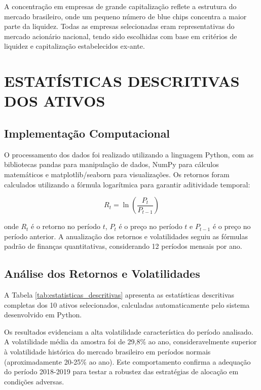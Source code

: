 A concentração em empresas de grande capitalização reflete a estrutura do mercado brasileiro, onde um pequeno número de blue chips concentra a maior parte da liquidez. Todas as empresas selecionadas eram representativas do mercado acionário nacional, tendo sido escolhidas com base em critérios de liquidez e capitalização estabelecidos ex-ante.

\section{ESTATÍSTICAS DESCRITIVAS DOS ATIVOS}

\subsection{Implementação Computacional}

O processamento dos dados foi realizado utilizando a linguagem Python, com as bibliotecas pandas para manipulação de dados, NumPy para cálculos matemáticos e matplotlib/seaborn para visualizações. Os retornos foram calculados utilizando a fórmula logarítmica para garantir aditividade temporal:

\begin{equation}
R_t = \ln\left(\frac{P_t}{P_{t-1}}\right)
\end{equation}

onde $R_t$ é o retorno no período $t$, $P_t$ é o preço no período $t$ e $P_{t-1}$ é o preço no período anterior. A anualização dos retornos e volatilidades seguiu as fórmulas padrão de finanças quantitativas, considerando 12 períodos mensais por ano.

\subsection{Análise dos Retornos e Volatilidades}

A Tabela \ref{tab:estatisticas_descritivas} apresenta as estatísticas descritivas completas dos 10 ativos selecionados, calculadas automaticamente pelo sistema desenvolvido em Python.



Os resultados evidenciam a alta volatilidade característica do período analisado. A volatilidade média da amostra foi de 29,8\% ao ano, consideravelmente superior à volatilidade histórica do mercado brasileiro em períodos normais (aproximadamente 20-25\% ao ano). Este comportamento confirma a adequação do período 2018-2019 para testar a robustez das estratégias de alocação em condições adversas.

